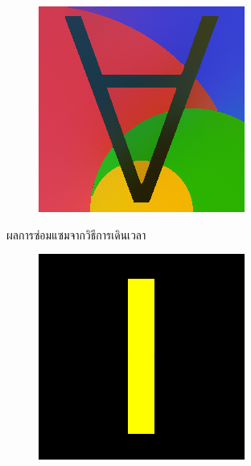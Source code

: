 \documentclass[xcolor=dvipsnames, xetex,serif]{beamer}
\numberwithin{equation}{section}
\begin{document}
\begin{frame}
\begin{figure}[H]
\begin{subfigure}{0.15\linewidth}
            \end{subfigure}
            \begin{subfigure}{0.15\linewidth}
                \centering
                \includegraphics[width=0.9\linewidth]{images/result_ex1/timemarch05.png}
            \end{subfigure}
            \caption{ผลการซ่อมแซมจากวิธีการเดินเวลา}
        \end{figure}
        \begin{figure}[H]
            \centering
            \begin{subfigure}{0.15\linewidth}
                \centering
                \includegraphics[width=0.9\linewidth]{images/result_ex1/fixpoint01.png}

\end{subfigure}
\end{figure}
\end{frame}
\end{document}
